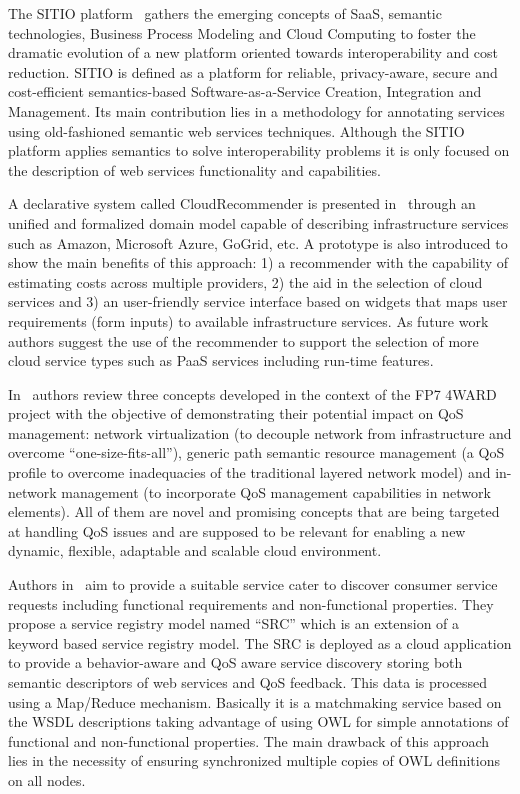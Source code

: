The SITIO platform~\cite{Garcia-Sanchez:2010:ASS:1852403.1852409} gathers the emerging concepts of SaaS, semantic technologies, Business Process 
Modeling and Cloud Computing to foster the dramatic evolution of a new platform oriented towards interoperability and cost reduction. SITIO is defined as a 
platform for reliable, privacy-aware, secure and cost-efficient semantics-based Software-as-a-Service Creation, Integration and Management. 
Its main contribution lies in a methodology for annotating services using old-fashioned semantic web services techniques.  Although the SITIO platform 
applies semantics to solve interoperability problems it is only focused on the description of web services functionality and capabilities.

A declarative system called CloudRecommender is presented in~\cite{DBLP:conf/gecon/ZhangRNMH12} 
through an unified and formalized domain model capable of describing infrastructure 
services such as Amazon, Microsoft Azure, GoGrid, etc. A prototype is also introduced to 
show the main benefits of this approach: 1) a recommender with the capability of estimating costs across 
multiple providers, 2) the aid in the selection of cloud services and 3) an user-friendly service interface based on 
widgets that maps user requirements (form inputs) to available infrastructure services. As future work 
authors suggest the use of the recommender to support the selection of more cloud service types 
such as PaaS services including run-time features.


In~\cite{5682131} authors review three concepts developed in the context of 
the FP7 4WARD project with the objective of demonstrating their potential impact on QoS 
management: network virtualization (to decouple network from infrastructure and overcome ``one-size-fits-all''), 
generic path semantic resource management (a QoS profile to overcome inadequacies of the traditional layered network model) 
and in-network management (to incorporate QoS management capabilities in network elements). All of them 
are novel and promising concepts that are being targeted at handling QoS issues and are supposed to be 
relevant for enabling a new dynamic, flexible, adaptable and scalable cloud environment.

Authors in~\cite{DBLP:conf/soca/ChenL10} aim to provide a suitable service cater to discover consumer 
service requests including functional requirements and non-functional 
properties. They propose a service registry model named ``SRC'' which is an 
extension of a keyword based service registry model. The SRC is deployed as a 
cloud application to provide a behavior-aware and QoS aware service discovery 
storing both semantic descriptors of web services and QoS feedback. This data is processed using a Map/Reduce 
mechanism. Basically it is a matchmaking service based on the WSDL descriptions 
taking advantage of using OWL for simple annotations of functional and 
non-functional properties. The main drawback of this approach 
lies in the necessity of ensuring synchronized multiple copies of OWL definitions on all nodes.


